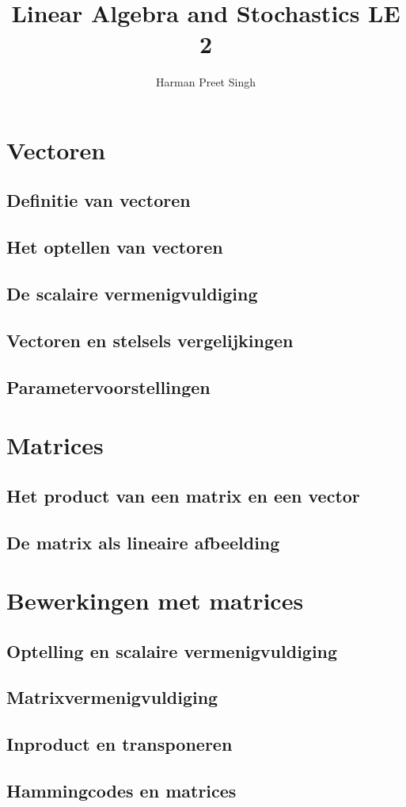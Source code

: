 \documentclass[a4paper, 12pt]{article}
\title{Linear Algebra and Stochastics \textemdash{} LE 2}
\author{Harman Preet Singh}
\begin{document}

\maketitle
\tableofcontents

\section{Vectoren}
\subsection{Definitie van vectoren}
\subsection{Het optellen van vectoren}
\subsection{De scalaire vermenigvuldiging}
\subsection{Vectoren en stelsels vergelijkingen}
\subsection{Parametervoorstellingen}

\section{Matrices}
\subsection{Het product van een matrix en een vector}
\subsection{De matrix als lineaire afbeelding}

\section{Bewerkingen met matrices}
\subsection{Optelling en scalaire vermenigvuldiging}
\subsection{Matrixvermenigvuldiging}
\subsection{Inproduct en transponeren}
\subsection{Hammingcodes en matrices}
\end{document}
